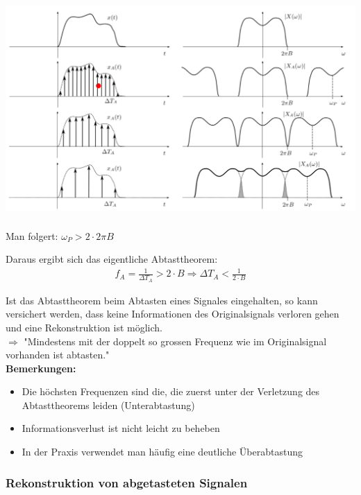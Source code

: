 \documentclass[12pt,a4paper]{scrartcl}
\begin{document}
\includegraphics[height=9cm]{Pictures/Abtasttheorem.png} \\
\noindent Man folgert: $\omega_P > 2 \cdot 2\pi B$

\noindent Daraus ergibt sich das eigentliche Abtasttheorem:
\begin{equation}
  \label{eq:14}
  \begin{split}
    f_A = \frac{1}{\Delta T_A} > 2 \cdot B
    \Rightarrow \Delta T_A < \frac{1}{2 \cdot B}
  \end{split}
\end{equation} 

\noindent Ist das Abtasttheorem beim Abtasten eines Signales eingehalten, so kann versichert werden,
dass keine Informationen des Originalsignals verloren gehen und eine Rekonstruktion ist möglich.\\
$\Rightarrow$ "Mindestens mit der doppelt so grossen Frequenz wie im Originalsignal vorhanden ist abtasten." \\

\noindent  \textbf{Bemerkungen:}
  \begin{itemize}
    \item Die höchsten Frequenzen sind die, die zuerst unter der Verletzung des Abtasttheorems leiden (Unterabtastung)
    \item Informationsverlust ist nicht leicht zu beheben
    \item In der Praxis verwendet man häufig eine deutliche Überabtastung \\
  \end{itemize}

  \subsubsection{Rekonstruktion von abgetasteten Signalen}
  \label{sec.sub:sub:rekonstruktion-von-abgetasteten-signalen}
\end{document}
